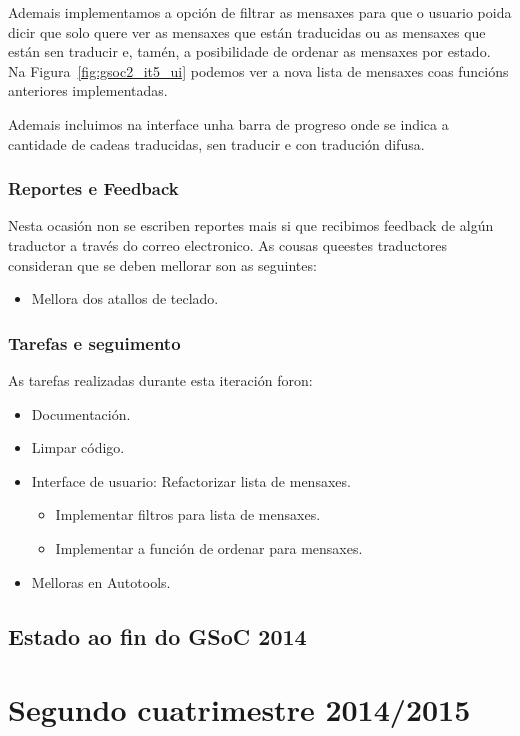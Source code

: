 Ademais implementamos a opción de filtrar as mensaxes para que o usuario poida dicir que solo quere ver as mensaxes que están traducidas ou as mensaxes que están sen traducir e, tamén, a posibilidade de ordenar as mensaxes por estado. Na Figura~\ref{fig:gsoc2_it5_ui} podemos ver a nova lista de mensaxes coas funcións anteriores implementadas.

Ademais incluimos na interface unha barra de progreso onde se indica a cantidade de cadeas traducidas, sen traducir e con tradución difusa.

\subsubsection{Reportes e Feedback}
Nesta ocasión non se escriben reportes mais si que recibimos feedback de algún traductor a través do correo electronico. As cousas queestes traductores consideran que se deben mellorar son as seguintes:

\begin{itemize}
  \item Mellora dos atallos de teclado.
\end{itemize}

\subsubsection{Tarefas e seguimento}

As tarefas realizadas durante esta iteración foron:

\begin{itemize}
  \item Documentación.
  \item Limpar código.
  \item Interface de usuario: Refactorizar lista de mensaxes.
    \begin{itemize}
      \item Implementar filtros para lista de mensaxes.
      \item Implementar a función de ordenar para mensaxes.
    \end{itemize}
  \item Melloras en Autotools.
\end{itemize}

\subsection{Estado ao fin do GSoC 2014}

\section{Segundo cuatrimestre 2014/2015}
